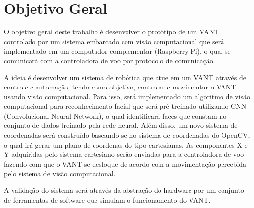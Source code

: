 
\section{Objetivo Geral}
O objetivo geral deste trabalho é desenvolver o protótipo de um VANT controlado por um sistema embarcado com visão computacional que será implementado em um computador complementar (Raspberry Pi), o qual se comunicará com a controladora de voo por protocolo de comunicação.

A ideia é desenvolver um sistema de robótica que atue em um VANT através de controle e automação, tendo como objetivo, controlar e movimentar o VANT usando visão computacional. Para isso, será implementado um algoritmo de visão computacional para reconhecimento facial que será pré treinado utilizando CNN (Convolucional Neural Network), o qual identificará faces que constam no conjunto de dados treinado pela rede neural. Além disso, um novo sistema de coordenadas será construído baseando-se no sistema de coordenadas do OpenCV, o qual irá gerar um plano de coordenas do tipo cartesianas. As componentes X e Y adquiridas pelo sistema cartesiano serão enviadas para a controladora de voo fazendo com que o VANT se desloque de acordo com a movimentação percebida pelo sistema de visão computacional.  

A validação do sistema será através da abstração do hardware por um conjunto de ferramentas de software que simulam o funcionamento do VANT.   



